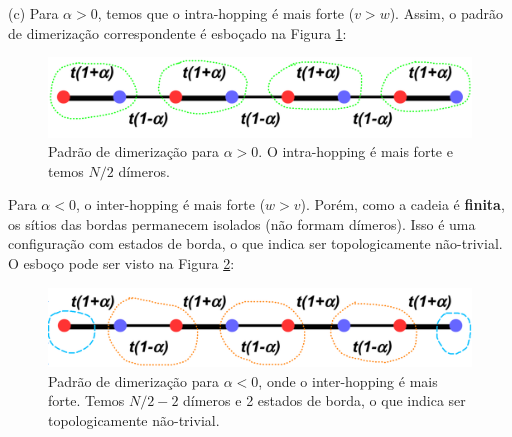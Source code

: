 \documentclass[a4paper,10pt]{article}
\begin{document}
(c) Para $\alpha > 0$, temos que o intra-hopping é mais forte ($v > w$). Assim, o padrão de dimerização correspondente é esboçado na Figura \ref{fig:intra}:
\begin{figure}[H]
\centering
\includegraphics[width=0.7\linewidth]{fig/intra.png}
\caption{Padrão de dimerização para $\alpha > 0$. O intra-hopping é mais forte e temos $N/2$ dímeros.}
\label{fig:intra}
\end{figure}
Para $\alpha < 0$, o inter-hopping é mais forte ($w > v$). Porém, como a cadeia é \textbf{finita}, os sítios das bordas permanecem isolados (não formam dímeros). Isso é uma configuração com estados de borda, o que indica ser topologicamente não-trivial. O esboço pode ser visto na Figura \ref{fig:inter}:
\begin{figure}[H]
\centering
\includegraphics[width=0.7\linewidth]{fig/inter}
\caption{Padrão de dimerização para $\alpha < 0$, onde o inter-hopping é mais forte. Temos $N/2 - 2$ dímeros e 2 estados de borda, o que indica ser topologicamente não-trivial.}
\label{fig:inter}
\end{figure}

\n\n
\end{document}
